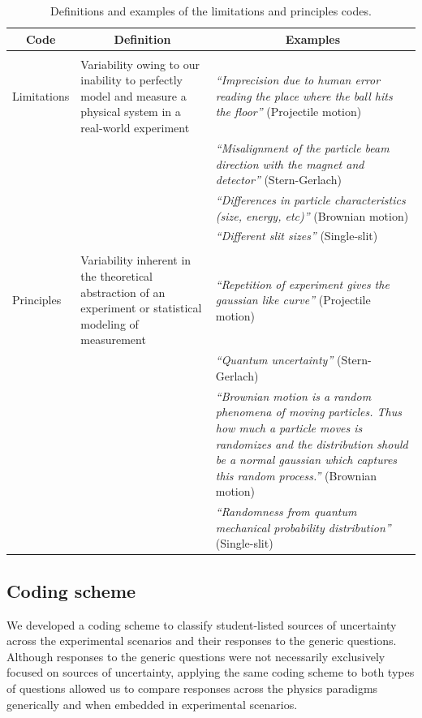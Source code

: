 \documentclass[english,aps,prstper,reprint,showpacs,longbibliography,superscriptaddress,nofootinbib]{revtex4-2}
\begin{document}
\begin{table}[tb] 
  \caption{Definitions and examples of the limitations and principles codes.}
  \label{ta:coding_scheme}
  \begin{ruledtabular}
    \begin{tabular}{p{}p{}p{}}
    \multicolumn{1}{c}{\textbf{Code}} & \multicolumn{1}{c}{\textbf{Definition}}& \multicolumn{1}{c}{\textbf{Examples}}\\
      \hline
      &&\\
    Limitations & Variability owing to our inability to perfectly model and measure a physical system in a real-world experiment & \textit{``Imprecision due to human error reading the place where the ball hits the floor''} (Projectile motion)\\
    && \textit{``Misalignment of the particle beam direction with the magnet and detector''} (Stern-Gerlach)\\
    &&\textit{``Differences in particle characteristics (size, energy, etc)''} (Brownian motion)\\
    &&\textit{``Different slit sizes''} (Single-slit)\\
    &&\\
    Principles & Variability inherent in the theoretical abstraction of an experiment or statistical modeling of measurement & \textit{``Repetition of experiment gives the gaussian like curve''} (Projectile motion) \\
    && \textit{``Quantum uncertainty''} (Stern-Gerlach) \\
    && \textit{ ``Brownian motion is a random phenomena of moving particles. Thus how much a particle moves is randomizes and the distribution should be a normal gaussian which captures this random process.''} (Brownian motion)\\
    & & \textit{ ``Randomness from quantum mechanical probability distribution''} (Single-slit)\\
    \end{tabular}
  \end{ruledtabular}
\end{table}

\subsection{Coding scheme}
\label{sec:coding_scheme}

We developed a coding scheme to classify student-listed sources of uncertainty across the experimental scenarios and their responses to the generic questions. Although responses to the generic questions were not necessarily exclusively focused on sources of uncertainty, applying the same coding scheme to both types of questions allowed us to compare responses across the physics paradigms generically and when embedded in experimental scenarios.
\end{document}
